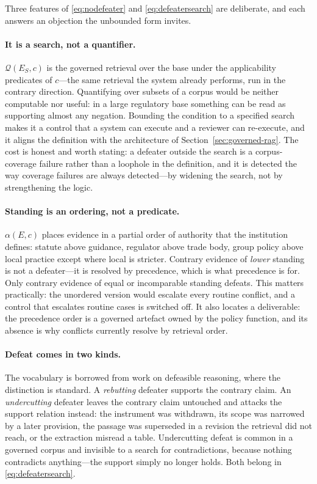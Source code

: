 \documentclass[11pt]{article}
\newcommand{\standing}{\alpha}
\theoremstyle{plain}
\theoremstyle{definition}
\begin{document}
Three features of \eqref{eq:nodefeater} and \eqref{eq:defeatersearch} are deliberate,
and each answers an objection the unbounded form invites.

\paragraph{It is a search, not a quantifier.} $\mathcal{Q}(E_S, c)$ is the governed
retrieval over the base under the applicability predicates of $c$---the same retrieval
the system already performs, run in the contrary direction. Quantifying over subsets of
a corpus would be neither computable nor useful: in a large regulatory base something
can be read as supporting almost any negation. Bounding the condition to a specified
search makes it a control that a system can execute and a reviewer can re-execute, and
it aligns the definition with the architecture of
Section~\ref{sec:governed-rag}. The cost is honest and worth stating: a defeater outside
the search is a corpus-coverage failure rather than a loophole in the definition, and it
is detected the way coverage failures are always detected---by widening the search, not
by strengthening the logic.

\paragraph{Standing is an ordering, not a predicate.} $\standing(E, c)$ places evidence
in a partial order of authority that the institution defines: statute above guidance,
regulator above trade body, group policy above local practice except where local is
stricter. Contrary evidence of \emph{lower} standing is not a defeater---it is resolved
by precedence, which is what precedence is for. Only contrary evidence of equal or
incomparable standing defeats. This matters practically: the unordered version would
escalate every routine conflict, and a control that escalates routine cases is switched
off. It also locates a deliverable: the precedence order is a governed artefact owned by
the policy function, and its absence is why conflicts currently resolve by retrieval
order.

\paragraph{Defeat comes in two kinds.} The vocabulary is borrowed from work on
defeasible reasoning, where the distinction is standard. A \emph{rebutting} defeater
supports the contrary claim. An \emph{undercutting} defeater leaves the contrary claim
untouched and attacks the support relation instead: the instrument was withdrawn, its
scope was narrowed by a later provision, the passage was superseded in a revision the
retrieval did not reach, or the extraction misread a table. Undercutting defeat is
common in a governed corpus and invisible to a search for contradictions, because
nothing contradicts anything---the support simply no longer holds. Both belong in
\eqref{eq:defeatersearch}.
\end{document}
